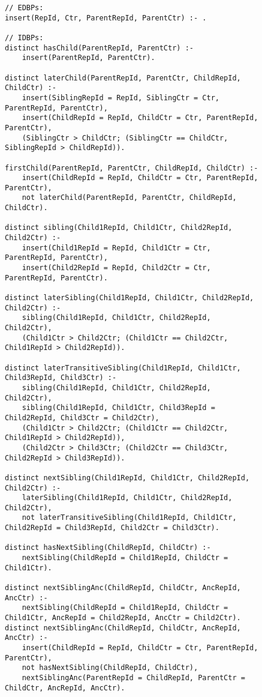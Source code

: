 \begin{figure}[htpb]
	\begin{lstlisting}[keepspaces]
// EDBPs:
insert(RepId, Ctr, ParentRepId, ParentCtr) :- .

// IDBPs:
distinct hasChild(ParentRepId, ParentCtr) :-
    insert(ParentRepId, ParentCtr).

distinct laterChild(ParentRepId, ParentCtr, ChildRepId, ChildCtr) :-
    insert(SiblingRepId = RepId, SiblingCtr = Ctr, ParentRepId, ParentCtr),
    insert(ChildRepId = RepId, ChildCtr = Ctr, ParentRepId, ParentCtr),
    (SiblingCtr > ChildCtr; (SiblingCtr == ChildCtr, SiblingRepId > ChildRepId)).

firstChild(ParentRepId, ParentCtr, ChildRepId, ChildCtr) :-
    insert(ChildRepId = RepId, ChildCtr = Ctr, ParentRepId, ParentCtr),
    not laterChild(ParentRepId, ParentCtr, ChildRepId, ChildCtr).

distinct sibling(Child1RepId, Child1Ctr, Child2RepId, Child2Ctr) :-
    insert(Child1RepId = RepId, Child1Ctr = Ctr, ParentRepId, ParentCtr),
    insert(Child2RepId = RepId, Child2Ctr = Ctr, ParentRepId, ParentCtr).

distinct laterSibling(Child1RepId, Child1Ctr, Child2RepId, Child2Ctr) :-
    sibling(Child1RepId, Child1Ctr, Child2RepId, Child2Ctr),
    (Child1Ctr > Child2Ctr; (Child1Ctr == Child2Ctr, Child1RepId > Child2RepId)).

distinct laterTransitiveSibling(Child1RepId, Child1Ctr, Child3RepId, Child3Ctr) :-
    sibling(Child1RepId, Child1Ctr, Child2RepId, Child2Ctr),
    sibling(Child1RepId, Child1Ctr, Child3RepId = Child2RepId, Child3Ctr = Child2Ctr),
    (Child1Ctr > Child2Ctr; (Child1Ctr == Child2Ctr, Child1RepId > Child2RepId)),
    (Child2Ctr > Child3Ctr; (Child2Ctr == Child3Ctr, Child2RepId > Child3RepId)).

distinct nextSibling(Child1RepId, Child1Ctr, Child2RepId, Child2Ctr) :-
    laterSibling(Child1RepId, Child1Ctr, Child2RepId, Child2Ctr),
    not laterTransitiveSibling(Child1RepId, Child1Ctr, Child2RepId = Child3RepId, Child2Ctr = Child3Ctr).

distinct hasNextSibling(ChildRepId, ChildCtr) :-
    nextSibling(ChildRepId = Child1RepId, ChildCtr = Child1Ctr).

distinct nextSiblingAnc(ChildRepId, ChildCtr, AncRepId, AncCtr) :-
    nextSibling(ChildRepId = Child1RepId, ChildCtr = Child1Ctr, AncRepId = Child2RepId, AncCtr = Child2Ctr).
distinct nextSiblingAnc(ChildRepId, ChildCtr, AncRepId, AncCtr) :-
    insert(ChildRepId = RepId, ChildCtr = Ctr, ParentRepId, ParentCtr),
    not hasNextSibling(ChildRepId, ChildCtr),
    nextSiblingAnc(ParentRepId = ChildRepId, ParentCtr = ChildCtr, AncRepId, AncCtr).


\end{lstlisting}
\end{figure}
